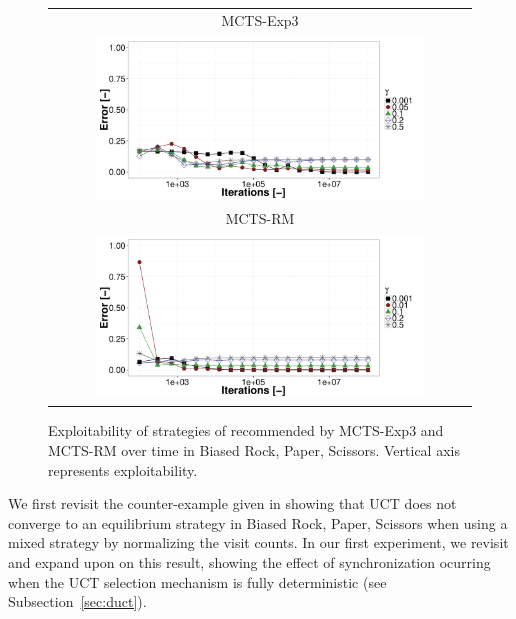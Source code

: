 \begin{figure}[t!]
\centering
\begin{tabular}{c}
{\small MCTS-Exp3} \\
\includegraphics[width=0.8\textwidth]{figures/brps-MCTS-EXP3.pdf} \\
{\small MCTS-RM} \\
\includegraphics[width=0.8\textwidth]{figures/brps-MCTS-RM.pdf} \\
\end{tabular}
\caption{Exploitability of strategies of recommended by MCTS-Exp3 and MCTS-RM over time in Biased Rock, Paper, Scissors. Vertical axis represents exploitability. }
\label{fig:expl-brps2}
\end{figure}

We first revisit the counter-example given in \cite{Shafiei09} showing that 
UCT does not converge to an equilibrium strategy in Biased Rock, Paper, Scissors 
when using a mixed strategy by normalizing the visit counts.
In our first experiment, we revisit and expand upon on this result, showing the effect of synchronization ocurring when the UCT selection mechanism is fully deterministic (see Subsection~\ref{sec:duct}).

